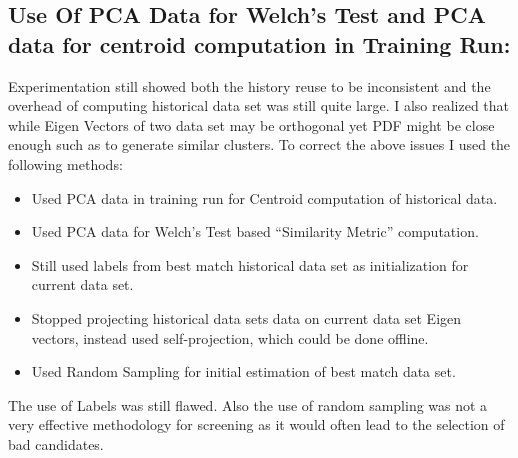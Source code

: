 \subsection{Use Of PCA Data for Welch’s Test and PCA data for centroid computation in Training Run:}
Experimentation still showed both the history reuse to be inconsistent and the overhead of computing historical data set was still quite large. I also realized that while Eigen Vectors of two data set may be orthogonal yet PDF might be close enough such as to generate similar clusters. To correct the above issues I used the following methods:
\begin{itemize}
    \item Used PCA data in training run for Centroid computation of historical data.
    \item Used PCA data for Welch’s Test based “Similarity Metric” computation.
    \item Still used labels from best match historical data set as initialization for current data set.
    \item Stopped projecting historical data sets data on current data set Eigen vectors, instead used self-projection, which could be done offline.
    \item Used Random Sampling for initial estimation of best match data set.
\end{itemize}
The use of Labels was still flawed. Also the use of random sampling was not a very effective methodology for screening as it would often lead to the selection of bad candidates.


